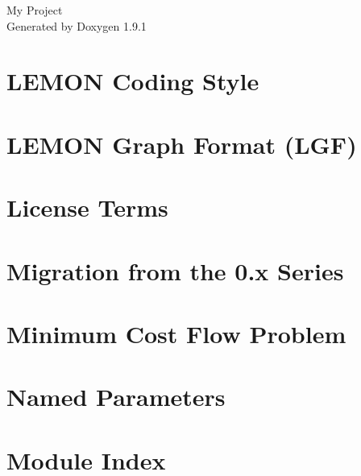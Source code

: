 \let\mypdfximage\pdfximage\def\pdfximage{\immediate\mypdfximage}\documentclass[twoside]{book}
\newcommand{\+}{\discretionary{\mbox{\scriptsize$\hookleftarrow$}}{}{}}
\newcommand{\clearemptydoublepage}{%
  \newpage{\pagestyle{empty}\cleardoublepage}%
}
\begin{document}
\raggedbottom

\hypersetup{pageanchor=false,
             bookmarksnumbered=true,
             pdfencoding=unicode
            }
\begin{titlepage}
\vspace*{7cm}
\begin{center}%
{\Large My Project }\\
\vspace*{1cm}
{\large Generated by Doxygen 1.9.1}\\
\end{center}
\end{titlepage}
\clearemptydoublepage
{}
\tableofcontents
\clearemptydoublepage
{}
\hypersetup{pageanchor=true}

\chapter{LEMON Coding Style}
\label{coding_style}

\chapter{LEMON Graph Format (LGF)}
\label{lgf-format}

\chapter{License Terms}
\label{license}

\chapter{Migration from the 0.x Series}
\label{migration}

\chapter{Minimum Cost Flow Problem}
\label{min_cost_flow}

\chapter{Named Parameters}
\label{named-param}

\chapter{Module Index}

\end{document}
